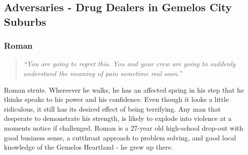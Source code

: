 \documentclass[letterpaper,serif]{rpg-module}
\begin{document}
\subsection{Adversaries - Drug Dealers in Gemelos City Suburbs}

\subsubsection{Roman}

\begin{quote}
\emph{``You are going to regret this. You and your crew are going to suddenly understand the meaning of pain sometime real soon.''}
\end{quote}

\vspace{-12pt}

Roman struts. Whereever he walks, he has an affected spring in his step that he thinks speaks to his power and his confidence. Even though it looks a little ridiculous, it still has its desired effect of being terrifying. Any man that desperate to demonstrate his strength, is likely to explode into violence at a moments notice if challenged. Roman is a 27-year old high-school drop-out with good business sense, a cutthroat approach to problem solving, and good local knowledge of the Gemelos Heartland - he grew up there. 
\end{document}
